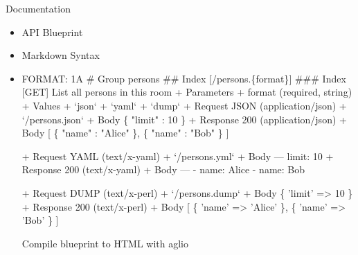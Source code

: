 \begin{frame}[fragile]{Documentation}
\pause
\begin{itemize}

\item API Blueprint\cite{apiblueprint}
\pause
\item Markdown Syntax
\pause

\item
{\tiny
\begin{multicols}{3}
\begin{semiverbatim}
FORMAT: 1A
# Group persons
## Index [\alert<5>{/persons.\{format\}}]
### Index [GET]
List all persons in this room
+ Parameters
    + format (\alert<6>{required, string})
        + Values
            + `json`
            + `yaml`
            + `dump`
+ Request \alert<7>{JSON} (\alert<8>{application/json})
    + `\alert<9>{/persons.json}`
    + Body
            \alert<10>{\{
               "limit" : 10
            \}}
+ Response 200 (application/json)
    + Body
            \alert<11>{[
               \{
                  "name" : "Alice"
               \},
               \{
                  "name" : "Bob"
               \}
            ]}
\end{semiverbatim}\columnbreak\begin{semiverbatim}
\alert<12>{+ Request YAML (text/x-yaml)
    + `/persons.yml`
    + Body
            --- 
            limit: 10
+ Response 200 (text/x-yaml)
    + Body
            --- 
            - 
              name: Alice
            - 
              name: Bob
}\end{semiverbatim}\columnbreak\begin{semiverbatim}
\alert<13>{+ Request DUMP (text/x-perl)
    + `/persons.dump`
    + Body
            \{
              'limit' => 10
            \}
+ Response 200 (text/x-perl)
    + Body
            [
              \{
                'name' => 'Alice'
              \},
              \{
                'name' => 'Bob'
              \}
            ]
}\end{semiverbatim}
\end{multicols}
}

\pause
\pause
\pause
\pause
\pause
\pause
\pause
\pause
\pause
\pause
Compile blueprint to HTML with aglio\cite{aglio}
\end{itemize}

\end{frame}


